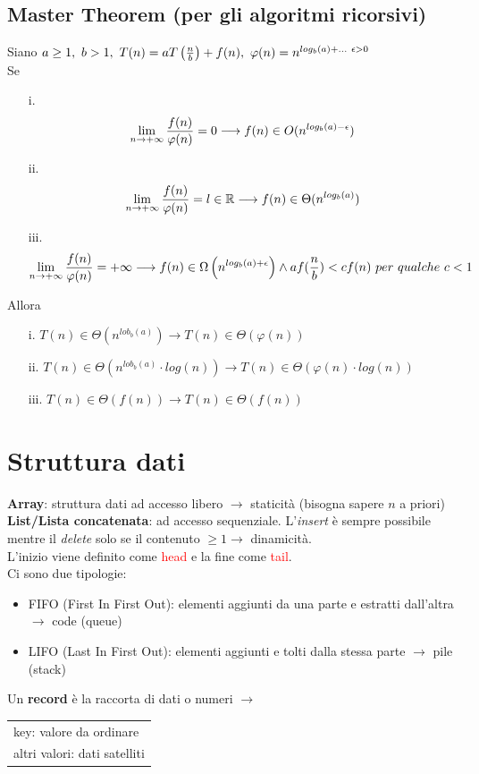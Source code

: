 \documentclass[12pt,a4paper]{article}
\begin{document}
\subsection{Master Theorem (per gli algoritmi ricorsivi)}
Siano $a \geq 1,\ b> 1,\ T(n)=aT\left({n \over b}\right)+f(n),\ \varphi(n)=n^{log_b(a)+ \dots \ \epsilon > 0}$\\
Se \begin{itemize}
\item[i.] $$\lim_{n \to +\infty}{f(n) \over \varphi(n)}=0 \longrightarrow f(n) \in O(n^{log_b(a)-\epsilon})$$
\item[ii.] $$\lim_{n \to +\infty}{f(n) \over \varphi(n)}=l \in \mathbb{R} \longrightarrow f(n) \in \Theta(n^{log_b(a)})$$
\item[iii.] $$\lim_{n \to +\infty}{f(n) \over \varphi(n)}=+\infty \longrightarrow f(n) \in \Omega\left(n^{log_b(a)+\epsilon}\right) \land af({n\over b}) < cf(n) \ per \ qualche\ c<1$$
\end{itemize}
Allora \begin{itemize}
\item[i.] $T(n) \in \Theta(n^{lob_b(a)}) \rightarrow T(n)\in \Theta(\varphi(n))$
\item[ii.] $T(n) \in \Theta\left(n^{lob_b(a)}\cdot log (n)\right) \rightarrow T(n)\in \Theta(\varphi(n)\cdot log(n))$
\item[iii.]$T(n) \in \Theta(f(n)) \rightarrow T(n)\in \Theta(f(n))$
\end{itemize}

\clearpage
\section{Struttura dati}
\textbf{Array}: struttura dati ad accesso libero $\rightarrow$ staticità (bisogna sapere $n$ a priori)\\
\textbf{List/Lista concatenata}: ad accesso sequenziale. L'\textsl{insert} è sempre possibile mentre il \textsl{delete} solo se il contenuto $\geq 1 \rightarrow$ dinamicità.\\
L'inizio viene definito come \textcolor{red}{head} e la fine come \textcolor{red}{tail}.\\
Ci sono due tipologie: \begin{itemize}
\item FIFO (First In First Out): elementi aggiunti da una parte e estratti dall'altra $\rightarrow$ code (queue)
\item LIFO (Last In First Out): elementi aggiunti e tolti dalla stessa parte $\rightarrow$ pile (stack)
\end{itemize}
Un \textbf{record} è la raccorta di dati o numeri $\rightarrow$ \begin{tabular}{l}key: valore da ordinare\\altri valori: dati satelliti \end{tabular}
\end{document}
